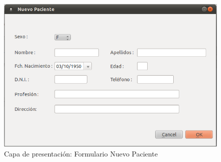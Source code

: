 \begin{itemize}
\begin{itemize}
\end{itemize}
\begin{figure}[H]
  \label{pnuevo}
  \begin{center}
    \includegraphics[scale=0.5]{../../Image/paciente-nuevo1.png}
  \end{center}
  \caption{Capa de presentación: Formulario Nuevo Paciente}
\end{figure}


\end{itemize}
